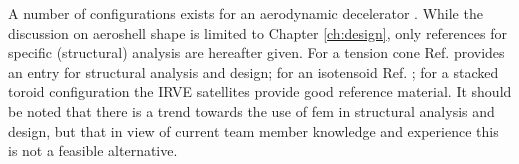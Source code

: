 A number of configurations exists for an aerodynamic decelerator \cite{Smith2010}. While the discussion on aeroshell shape is limited to Chapter \ref{ch:design}, only references for specific (structural) analysis are hereafter given. For a tension cone Ref. \cite{Yamada2009} provides an entry for structural analysis and design; for an isotensoid Ref. \cite{Smith2011}; for a stacked toroid configuration the IRVE satellites provide good reference material. It should be noted that there is a trend towards the use of \gls{fem} in structural analysis and design, but that in view of current team member knowledge and experience this is not a feasible alternative.













